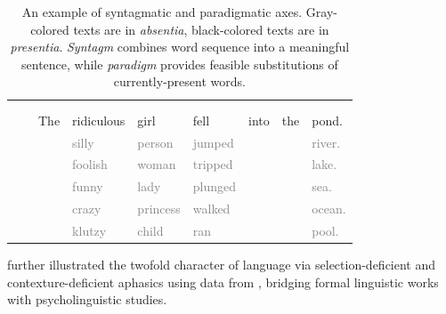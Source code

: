 \begin{table}
    \centering
    \begin{ThreePartTable}  
    \begin{tabularx}{\textwidth}{p{3mm}p{1mm}*{7}{L}}
     &  \\
     \parbox[t]{1mm}{} &  &  &  &  &  & & &   \\
    & & The & ridiculous & girl & fell & into & the & pond. \\
    & & & \textcolor{gray}{silly} & \textcolor{gray}{person} & \textcolor{gray}{jumped} & & & \textcolor{gray}{river.} \\
    & & & \textcolor{gray}{foolish} & \textcolor{gray}{woman} & \textcolor{gray}{tripped} & & & \textcolor{gray}{lake.} \\
    & & & \textcolor{gray}{funny} & \textcolor{gray}{lady} & \textcolor{gray}{plunged} & & & \textcolor{gray}{sea.} \\
    & & & \textcolor{gray}{crazy} & \textcolor{gray}{princess} & \textcolor{gray}{walked} & & & \textcolor{gray}{ocean.} \\
    &  & & \textcolor{gray}{klutzy} & \textcolor{gray}{child} & \textcolor{gray}{ran} & &  & \textcolor{gray}{pool.} \\
    \end{tabularx}
    \end{ThreePartTable}
    \caption[Example of Syntagmatic and Paradigmatic Axes]{An example of syntagmatic and paradigmatic axes. Gray-colored texts are in \emph{absentia}, black-colored texts are in \emph{presentia}. \emph{Syntagm} combines word sequence into a meaningful sentence, while \emph{paradigm} provides feasible substitutions of currently-present words.\label{tab:egsyntagparadig}}
\end{table}


\citeauthor{jakobsonFundamentalsLanguage1963} further illustrated the twofold character of language via selection-deficient and contexture-deficient aphasics using data from \textcite{goldsteinLanguageLanguageDisturbances1948, headAphasiaKindredDisorders1920, hughlingsjacksonAffectionsSpeechDisease1879, goldsteinProblemMeaningWords1971, luriaWorkingBrainIntroduction1976c, crutchAbstractConcreteConcepts2004, warringtonCategorySpecificAccess1983}, bridging formal linguistic works with psycholinguistic studies.


